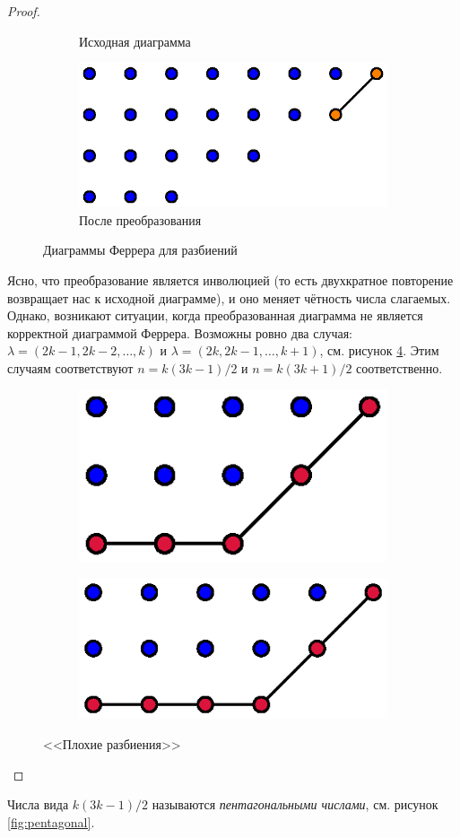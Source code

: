 \documentclass{article}
\theoremstyle{definition}
\begin{document}
\begin{proof}
\begin{figure}[h]
\begin{subfigure}{.33\textwidth}
	\caption{Исходная диаграмма}
	\label{fig:ferrer_2}	
\end{subfigure}
\begin{subfigure}{.33\textwidth}
	\centering
	\includegraphics[width=.8\textwidth]{ferrer_3}
	\caption{После преобразования}
	\label{fig:ferrer_3}	
\end{subfigure}
\caption{Диаграммы Феррера для разбиений}
\end{figure}
Ясно, что преобразование является инволюцией (то есть двухкратное 
повторение возвращает нас к исходной диаграмме), и оно меняет чётность 
числа слагаемых. Однако, возникают ситуации, когда преобразованная 
диаграмма не является корректной диаграммой Феррера. Возможны ровно два случая: 
\( \lambda = (2k-1, 2k-2, \ldots,k) \) и \( \lambda = (2k, 2k-1, \ldots, k+1) 
\), см. рисунок \ref{fig:ferrer_4}. Этим случаям соответствуют \( n = k(3k-1)/2 
\) и \( n = k(3k+1)/2 \) соответственно.
\begin{figure}[h]
\centering
\begin{subfigure}{.4\textwidth}
	\centering
	\includegraphics[width=.5\textwidth]{ferrer_4}
\end{subfigure}%
\begin{subfigure}{.4\textwidth}
	\centering
	\includegraphics[width=.6\textwidth]{ferrer_5}
\end{subfigure}
\caption{<<Плохие разбиения>>}
\label{fig:ferrer_4}	
\end{figure}
\end{proof}
Числа вида \( k(3k-1)/2 \) называются \textit{пентагональными числами}, см. 
рисунок \ref{fig:pentagonal}.
\end{document}
